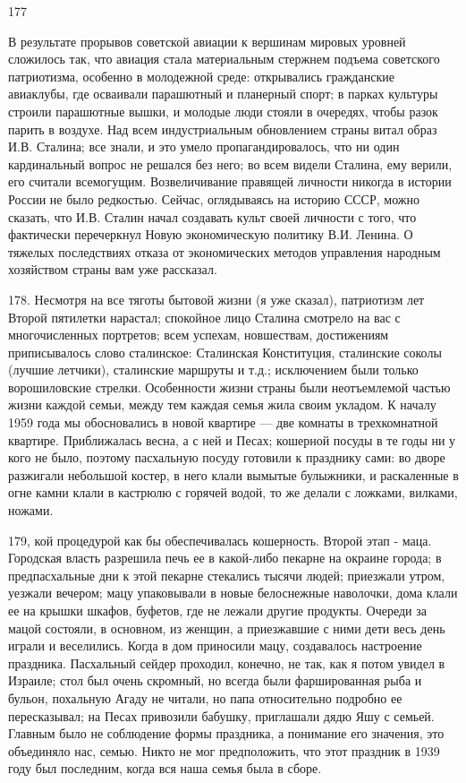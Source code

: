 177

В результате прорывов советской авиации к вершинам мировых уровней сложилось так, что авиация стала материальным стержнем подъема советского патриотизма, особенно в молодежной среде: открывались гражданские авиаклубы, где осваивали парашютный и планерный спорт; в парках культуры строили парашютные вышки, и молодые люди стояли в очередях, чтобы разок парить в воздухе. Над всем индустриальным обновлением страны витал образ И.В. Сталина; все знали, и это умело пропагандировалось, что ни один кардинальный вопрос не решался без него; во всем видели Сталина, ему верили, его считали всемогущим. Возвеличивание правящей личности никогда в истории России не было редкостью. Сейчас, оглядываясь на историю СССР, можно сказать, что И.В. Сталин начал создавать культ своей личности с того, что фактически перечеркнул Новую экономическую политику В.И. Ленина. О тяжелых последствиях отказа от экономических методов управления народным хозяйством страны вам уже рассказал.

178. Несмотря на все тяготы бытовой жизни (я уже сказал), патриотизм лет Второй пятилетки нарастал; спокойное лицо Сталина смотрело на вас с многочисленных портретов; всем успехам, новшествам, достижениям приписывалось слово сталинское: Сталинская Конституция, сталинские соколы (лучшие летчики), сталинские маршруты и т.д.; исключением были только ворошиловские стрелки. Особенности жизни страны были неотъемлемой частью жизни каждой семьи, между тем каждая семья жила своим укладом. К началу 1959 года мы обосновались в новой квартире — две комнаты в трехкомнатной квартире. Приближалась весна, а с ней и Песах; кошерной посуды в те годы ни у кого не было, поэтому пасхальную посуду готовили к празднику сами: во дворе разжигали небольшой костер, в него клали вымытые булыжники, и раскаленные в огне камни клали в кастрюлю с горячей водой, то же делали с ложками, вилками, ножами.

179, кой процедурой как бы обеспечивалась кошерность. Второй этап - маца. Городская власть разрешила печь ее в какой-либо пекарне на окраине города; в предпасхальные дни к этой пекарне стекались тысячи людей; приезжали утром, уезжали вечером; мацу упаковывали в новые белоснежные наволочки, дома клали ее на крышки шкафов, буфетов, где не лежали другие продукты. Очереди за мацой состояли, в основном, из женщин, а приезжавшие с ними дети весь день играли и веселились. Когда в дом приносили мацу, создавалось настроение праздника. Пасхальный сейдер проходил, конечно, не так, как я потом увидел в Израиле; стол был очень скромный, но всегда были фаршированная рыба и бульон, похальную Агаду не читали, но папа относительно подробно ее пересказывал; на Песах привозили бабушку, приглашали дядю Яшу с семьей. Главным было не соблюдение формы праздника, а понимание его значения, это объединяло нас, семью. Никто не мог предположить, что этот праздник в 1939 году был последним, когда вся наша семья была в сборе.

